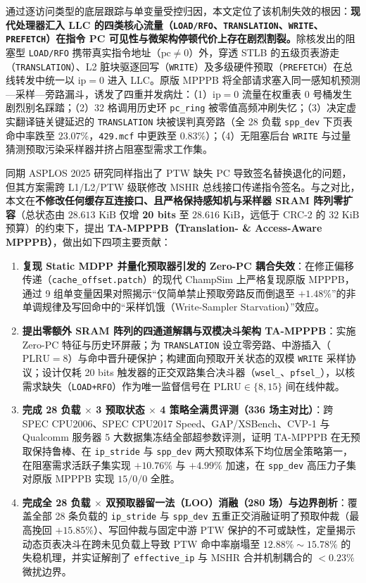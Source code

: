 \documentclass[10.5pt,compsoc,UTF8]{CjC}
\newcommand{\upcite}[1]{\cite{#1}}
\begin{document}
通过逐访问类型的底层跟踪与单变量受控归因，本文定位了该机制失效的根因：\textbf{现代处理器汇入 LLC 的四类核心流量（\texttt{LOAD/RFO}、\texttt{TRANSLATION}、\texttt{WRITE}、\texttt{PREFETCH}）在指令 PC 可见性与微架构停顿代价上存在剧烈割裂。}除核发出的阻塞型 \texttt{LOAD/RFO} 携带真实指令地址（$\mathrm{pc}\ne 0$）外，穿透 STLB 的五级页表游走（\texttt{TRANSLATION}）、L2 脏块驱逐回写（\texttt{WRITE}）及多级硬件预取（\texttt{PREFETCH}）在总线转发中统一以 $\mathrm{ip}=0$ 进入 LLC。原版 MPPPB 将全部请求塞入同一感知机预测—采样—旁路漏斗，诱发了四重并发病灶：（1）$\mathrm{ip}=0$ 流量在权重表 0 号桶发生剧烈别名踩踏；（2）32 格调用历史环 \texttt{pc\_ring} 被零值高频冲刷失忆；（3）决定虚实翻译链关键延迟的 \texttt{TRANSLATION} 块被误判真旁路（全 28 负载 \texttt{spp\_dev} 下页表命中率跌至 $23.07\%$，\texttt{429.mcf} 中更跌至 $0.83\%$）；（4）无阻塞后台 \texttt{WRITE} 与过量猜测预取污染采样器并挤占阻塞型需求工作集。

同期 ASPLOS 2025 研究\upcite{vavouliotis2025translation}同样指出了 PTW 缺失 PC 导致签名替换退化的问题，但其方案需跨 L1/L2/PTW 级联修改 MSHR 总线接口传递指令签名。与之对比，本文在\textbf{不修改任何缓存互连接口、且严格保持感知机与采样器 SRAM 阵列零扩容}（总状态由 $28.613\text{ KiB}$ 仅增 \textbf{20 bits} 至 $28.616\text{ KiB}$，远低于 CRC-2 的 $32\text{ KiB}$ 预算）的约束下，提出 \textbf{TA-MPPPB（Translation- \& Access-Aware MPPPB）}，做出如下四项主要贡献：

\begin{enumerate}
  \item \textbf{复现 Static MDPP 并量化预取器引发的 Zero-PC 耦合失效}：在修正偏移传递（\texttt{cache\_offset.patch}）的现代 ChampSim 上严格复现原版 MPPPB，通过 9 组单变量因果对照揭示“仅简单禁止预取旁路反而倒退至 $+1.48\%$”的非单调规律及写回命中的“采样饥饿（Write-Sampler Starvation）”效应。
  \item \textbf{提出零额外 SRAM 阵列的四通道解耦与双模决斗架构 TA-MPPPB}：实施 Zero-PC 特征与历史环屏蔽；为 \texttt{TRANSLATION} 设立零旁路、中游插入（$\mathrm{PLRU}=8$）与命中晋升硬保护；构建面向预取开关状态的双模 \texttt{WRITE} 采样协议；设计仅耗 20 bits 触发器的正交双路集合决斗器（\texttt{wsel\_}、\texttt{pfsel\_}），以核需求缺失（\texttt{LOAD+RFO}）作为唯一监督信号在 $\mathrm{PLRU}\in\{8,15\}$ 间在线仲裁。
  \item \textbf{完成 28 负载 $\times$ 3 预取状态 $\times$ 4 策略全满贯评测（336 场主对比）}：跨 SPEC CPU2006、SPEC CPU2017 Speed、GAP/XSBench、CVP-1 与 Qualcomm 服务器 5 大数据集冻结全部超参数评测，证明 TA-MPPPB 在无预取保持鲁棒、在 \texttt{ip\_stride} 与 \texttt{spp\_dev} 两大预取体系下均位居全策略第一，在阻塞需求活跃子集实现 $+10.76\%$ 与 $+4.99\%$ 加速，在 \texttt{spp\_dev} 高压力子集对原版 MPPPB 实现 $15/0/0$ 全胜。
  \item \textbf{完成全 28 负载 $\times$ 双预取器留一法（LOO）消融（280 场）与边界剖析}：覆盖全部 28 条负载的 \texttt{ip\_stride} 与 \texttt{spp\_dev} 五重正交消融证明了预取仲裁（最高挽回 $+15.85\%$）、写回仲裁与固定中游 PTW 保护的不可或缺性，定量揭示动态页表决斗在跨未见负载上导致 PTW 命中率崩塌至 $12.88\%\sim 15.78\%$ 的失稳机理，并实证解剖了 \texttt{effective\_\allowbreak ip} 与 MSHR 合并机制耦合的 $<0.23\%$ 微扰边界。
\end{enumerate}
\end{document}
